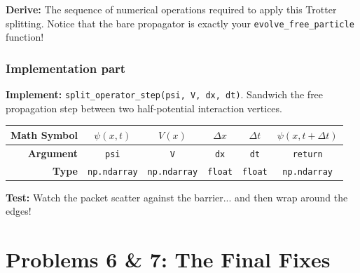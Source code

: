 \documentclass[11pt]{article}
\begin{document}
\textbf{Derive:} The sequence of numerical operations required to apply this Trotter splitting. Notice that the bare propagator is exactly your \lstinline|evolve_free_particle| function!

\subsubsection*{Implementation part}
\textbf{Implement:} \lstinline|split_operator_step(psi, V, dx, dt)|. Sandwich the free propagation step between two half-potential interaction vertices.
\begin{center}
\renewcommand{\arraystretch}{2.0}
\begin{tabular}{r | c | c | c | c | c}
\toprule
\textbf{Math Symbol} & $\psi(x, t)$ & $V(x)$ & $\Delta x$ & $\Delta t$ & $\psi(x, t+\Delta t)$ \\
\midrule
\textbf{Argument} & \lstinline|psi| & \lstinline|V| & \lstinline|dx| & \lstinline|dt| & \lstinline|return| \\
\midrule
\textbf{Type} & \lstinline|np.ndarray| & \lstinline|np.ndarray| & \lstinline|float| & \lstinline|float| & \lstinline|np.ndarray| \\
\bottomrule
\end{tabular}
\end{center}
\textbf{Test:} Watch the packet scatter against the barrier... and then wrap around the edges!


\section*{Problems 6 \& 7: The Final Fixes}
\end{document}
